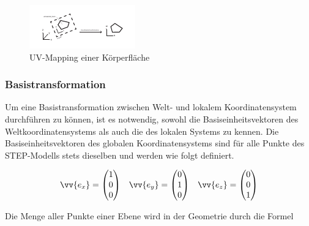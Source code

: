 \begin{figure}[h]
	\centering
	
	\includegraphics[width=0.7\linewidth]{img/uvwmapping.pdf}
	
	\caption{UV-Mapping einer Körperfläche}
	\label{fig:uvwmapping}
	
\end{figure}
 
\subsubsection{Basistransformation}

Um eine Basistransformation zwischen Welt- und lokalem Koordinatensystem durchführen zu können, ist es notwendig, sowohl die Basiseinheitsvektoren des Weltkoordinatensystems als auch die des lokalen Systems zu kennen. Die Basiseinheitsvektoren des globalen Koordinatensystems sind für alle Punkte des STEP-Modells stets dieselben und werden wie folgt definiert.

\begin{singlespace}
	\begin{equation}
	\begin{aligned}
	\vv{e_{x}}=\begin{pmatrix}
	1 \\ 
	0 \\ 
	0
	\end{pmatrix}  
	&& 
	\vv{e_{y}}=\begin{pmatrix}
	0 \\ 
	1 \\ 
	0
	\end{pmatrix}  
	&& 
	\vv{e_{z}}=\begin{pmatrix}
	0 \\ 
	0 \\ 
	1
	\end{pmatrix} 
	\end{aligned}
	\end{equation}
\end{singlespace}

Die Menge aller Punkte einer Ebene wird in der Geometrie durch die Formel

